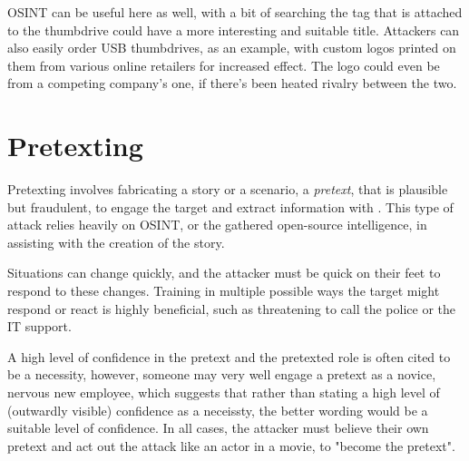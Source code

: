 
OSINT can be useful here as well, with a bit of searching the tag that is attached to the thumbdrive could have a more interesting and suitable title. Attackers can also easily order USB thumbdrives, as an example, with custom logos printed on them from various online retailers for increased effect. The logo could even be from a competing company's one, if there's been heated rivalry between the two.










\section{Pretexting}

Pretexting involves fabricating a story or a scenario, a \textit{pretext}, that is plausible but fraudulent, to engage the target and extract information with \citep{conteh_cybersecurityrisks_2016}. This type of attack relies heavily on OSINT, or the gathered open-source intelligence, in assisting with the creation of the story.

Situations can change quickly, and the attacker must be quick on their feet to respond to these changes. Training in multiple possible ways the target might respond or react is highly beneficial, such as threatening to call the police or the IT support.

A high level of confidence in the pretext and the pretexted role is often cited to be a necessity, however, someone may very well engage a pretext as a novice, nervous new employee, which suggests that rather than stating a high level of (outwardly visible) confidence as a neceissty, the better wording would be a suitable level of confidence. In all cases, the attacker must believe their own pretext and act out the attack like an actor in a movie, to "become the pretext".

